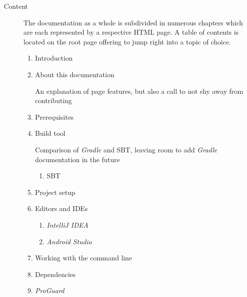 \begin{description}

	\item[Content]\hfill

	The documentation as a whole is subdivided in numerous chapters which are each represented by a respective \ac{HTML} page. A table of contents is located on the root page offering to jump right into a topic of choice.

	\begin{enumerate}

		\item Introduction

		\item About this documentation

		An explanation of page features, but also a call to not shy away from contributing

		\item Prerequisites

		\item Build tool

		Comparison of \textit{Gradle} and \ac{SBT}, leaving room to add \textit{Gradle} documentation in the future

		\begin{enumerate}

			\item \ac{SBT}

		\end{enumerate}

		\item Project setup

		\item Editors and \acp{IDE}

		\begin{enumerate}

			\item \textit{IntelliJ IDEA}

			\item \textit{Android Studio}

		\end{enumerate}

		\item Working with the command line

		\item Dependencies

		\item \textit{ProGuard}

		\begin{enumerate}


\end{enumerate}
\end{enumerate}
\end{description}
